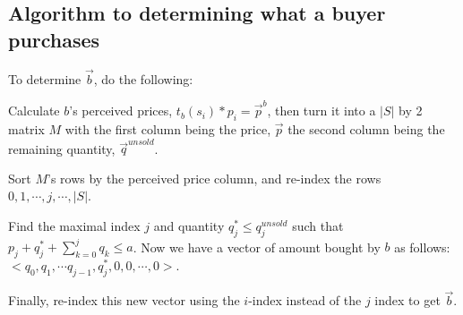 \documentclass[14pt]{article}
\begin{document}
\subsection{Algorithm to determining what a buyer purchases}
To determine $\vec{b}$, do the following:

Calculate $b$'s perceived prices, $t_b(s_i) * p_i = \vec{p}^b$, then turn it
into a $|S|$ by 2 matrix $M$ with the first column being the price, $\vec{p}$
the second column being the remaining quantity, $\vec{q}^{unsold}$. 

Sort $M$'s rows by the perceived price column, and re-index the rows\newline $0,
1, \cdots , j, \cdots , |S|$. 

Find the maximal index $j$ and quantity $q^{*}_j \le q^{unsold}_j$ such that
$p_j + q^{*}_j + \sum_{k=0}^j q_k \le a$.  Now we have a vector of amount bought
by $b$ as follows: $<q_0, q_1,\cdots q_{j-1}, q^{*}_j, 0, 0, \cdots, 0>.$

Finally, re-index this new vector using the $i$-index instead of the $j$ index
to get $\vec{b}$.
\end{document}
